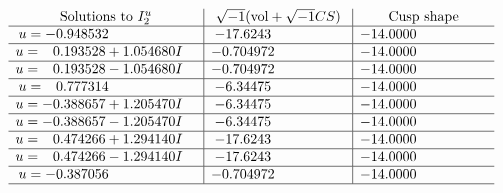 \documentclass[1p]{elsarticle_modified}
\theoremstyle{definition}
\newcommand{\I}{\sqrt{-1}}
\begin{document}
$$\begin{array}{c|c|c}  
\text{Solutions to }I^u_{2}& \I (\text{vol} + \sqrt{-1}CS) & \text{Cusp shape}\\
 \hline 
\begin{aligned}
u &= -0.948532\phantom{ +0.000000I}\end{aligned}
 & -17.6243\phantom{ +0.000000I} & -14.0000\phantom{ +0.000000I} \\ \hline\begin{aligned}
u &= \phantom{-}0.193528 + 1.054680 I\end{aligned}
 & -0.704972\phantom{ +0.000000I} & -14.0000\phantom{ +0.000000I} \\ \hline\begin{aligned}
u &= \phantom{-}0.193528 - 1.054680 I\end{aligned}
 & -0.704972\phantom{ +0.000000I} & -14.0000\phantom{ +0.000000I} \\ \hline\begin{aligned}
u &= \phantom{-}0.777314\phantom{ +0.000000I}\end{aligned}
 & -6.34475\phantom{ +0.000000I} & -14.0000\phantom{ +0.000000I} \\ \hline\begin{aligned}
u &= -0.388657 + 1.205470 I\end{aligned}
 & -6.34475\phantom{ +0.000000I} & -14.0000\phantom{ +0.000000I} \\ \hline\begin{aligned}
u &= -0.388657 - 1.205470 I\end{aligned}
 & -6.34475\phantom{ +0.000000I} & -14.0000\phantom{ +0.000000I} \\ \hline\begin{aligned}
u &= \phantom{-}0.474266 + 1.294140 I\end{aligned}
 & -17.6243\phantom{ +0.000000I} & -14.0000\phantom{ +0.000000I} \\ \hline\begin{aligned}
u &= \phantom{-}0.474266 - 1.294140 I\end{aligned}
 & -17.6243\phantom{ +0.000000I} & -14.0000\phantom{ +0.000000I} \\ \hline\begin{aligned}
u &= -0.387056\phantom{ +0.000000I}\end{aligned}
 & -0.704972\phantom{ +0.000000I} & -14.0000\phantom{ +0.000000I}\\
 \hline 
 \end{array}$$\newpage
\newpage\renewcommand{\arraystretch}{1}
\end{document}
